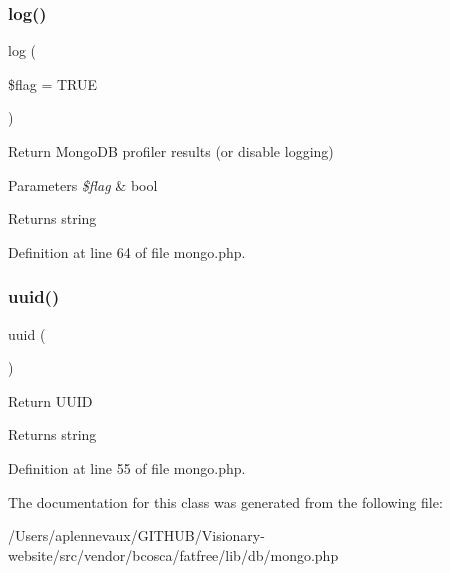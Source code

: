 \subsubsection{\texorpdfstring{log()}{log()}}
{\footnotesize\ttfamily log (\begin{DoxyParamCaption}\item[{}]{\$flag = {\ttfamily TRUE} }\end{DoxyParamCaption})}

Return Mongo\+DB profiler results (or disable logging) 
\begin{DoxyParams}{Parameters}
{\em \$flag} & bool \\
\hline
\end{DoxyParams}
\begin{DoxyReturn}{Returns}
string 
\end{DoxyReturn}


Definition at line 64 of file mongo.\+php.

\hypertarget{class_d_b_1_1_mongo_a0a684acda95e124d8596758e4986fe44}{}\label{class_d_b_1_1_mongo_a0a684acda95e124d8596758e4986fe44} 
\subsubsection{\texorpdfstring{uuid()}{uuid()}}
{\footnotesize\ttfamily uuid (\begin{DoxyParamCaption}{ }\end{DoxyParamCaption})}

Return U\+U\+ID \begin{DoxyReturn}{Returns}
string 
\end{DoxyReturn}


Definition at line 55 of file mongo.\+php.



The documentation for this class was generated from the following file\+:\begin{DoxyCompactItemize}
\item 
/\+Users/aplennevaux/\+G\+I\+T\+H\+U\+B/\+Visionary-\/website/src/vendor/bcosca/fatfree/lib/db/mongo.\+php\end{DoxyCompactItemize}
